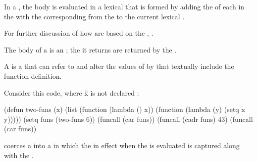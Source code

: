 \endsubsubsection%

\endSubsection%




In a ,
the body is evaluated in a lexical  that is formed by
adding the  of 
each  in the 
with the corresponding  from the 
to the current lexical .

For further discussion of how  are  
based on the , \seesection\LambdaLists.

The body of a  is an ;
the  it returns are returned by the .


\endsubsection%

 
A  is a  that can refer to and alter
the values of   by  
that textually include the function definition.
 
Consider this code, where \f{x} is not declared :
 
\code
 (defun two-funs (x)
   (list (function (lambda () x))
         (function (lambda (y) (setq x y)))))
 (setq funs (two-funs 6))
 (funcall (car funs)) 
 (funcall (cadr funs) 43) 
 (funcall (car funs)) 
\endcode

 coerces a 
 into a  in which the 
 in effect when the  is
evaluated is captured along with the .


